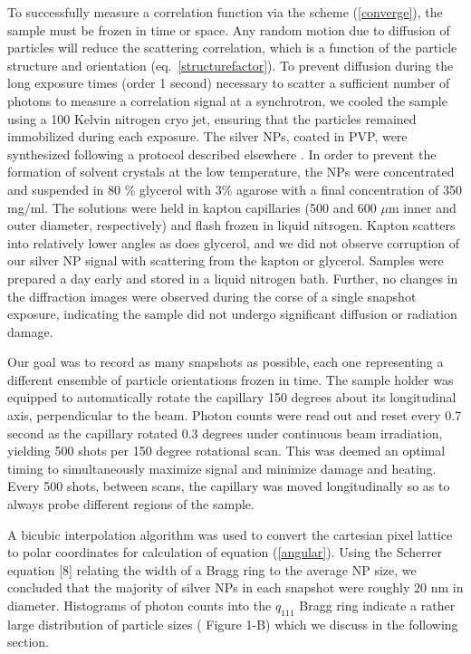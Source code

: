 \documentclass [11pt,fleqn]{article}
\begin{document}
To successfully measure a correlation function via the scheme (\ref{converge}), the sample must be frozen in time or space. Any random motion due to diffusion of particles will reduce the scattering correlation, which is a function of the particle structure and orientation (eq.~\ref{structurefactor}). To prevent diffusion during the long exposure times (order 1 second) necessary to scatter a sufficient number of photons to measure a correlation signal at a synchrotron, we cooled the sample using a 100 Kelvin nitrogen cryo jet, ensuring that the particles remained immobilized during each exposure. The silver NPs, coated in PVP, were synthesized following a protocol described elsewhere \cite{Levard:2011bx}. In order to prevent the formation of solvent crystals at the low temperature, the NPs were concentrated and suspended in 80 \% glycerol with 3\% agarose with a final concentration of 350 mg/ml. The solutions were held in kapton capillaries (500 and 600 $\mu$m inner and outer diameter, respectively) and flash frozen in liquid nitrogen. Kapton scatters into relatively lower angles as does glycerol, and we did not observe corruption of our silver NP signal with scattering from the kapton or glycerol. Samples were prepared a day early and stored in a liquid nitrogen bath. Further, no changes in the diffraction images were observed during the corse of a single snapshot exposure, indicating the sample did not undergo significant diffusion or radiation damage.

Our goal was to record as many snapshots as possible, each one representing a different ensemble of particle orientations frozen in time. The sample holder was equipped to automatically rotate the capillary 150 degrees about its longitudinal axis, perpendicular to the beam. Photon counts were read out and reset every 0.7 second as the capillary rotated 0.3 degrees under continuous beam irradiation, yielding 500 shots per 150 degree rotational scan. This was deemed an optimal timing to simultaneously maximize signal and minimize damage and heating. Every 500 shots, between scans, the capillary was moved longitudinally so as to always probe different regions of the sample.

A bicubic interpolation algorithm was used to convert the cartesian pixel lattice to polar coordinates for calculation of equation (\ref{angular}). Using the Scherrer equation [8] relating the width of a Bragg ring to the average NP size, we concluded that the majority of silver NPs in each snapshot were roughly 20 nm in diameter. Histograms of photon counts into the $q_{111}$ Bragg ring indicate a rather large distribution of particle sizes ( Figure 1-B) which we discuss in the following section.
\end{document}
